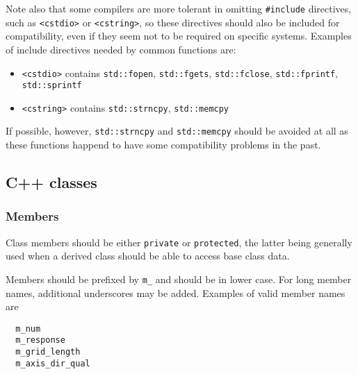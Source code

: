 \documentclass{article}[12pt,a4]
\begin{document}
Note also that some compilers are more tolerant in omitting {\tt \#include} directives, such
as {\tt <cstdio>} or {\tt <cstring>}, so these directives should also be included for compatibility,
even if they seem not to be required on specific systems.
Examples of include directives needed by common functions are:
\begin{itemize}
\item[] {\tt <cstdio>} contains {\tt std::fopen}, {\tt std::fgets}, {\tt std::fclose}, {\tt std::fprintf}, {\tt std::sprintf}
\item[] {\tt <cstring>} contains {\tt std::strncpy}, {\tt std::memcpy}
\end{itemize}

If possible, however, {\tt std::strncpy} and {\tt std::memcpy} should be avoided at all as these
functions happend to have some compatibility problems in the past.



\subsection{C++ classes}

\subsubsection{Members}

Class members should be either {\tt private} or {\tt protected}, the latter being generally used
when a derived class should be able to access base class data.

Members should be prefixed by {\tt m\_} and should be in lower case.
For long member names, additional underscores may be added.
Examples of valid member names are
\begin{verbatim}
  m_num
  m_response
  m_grid_length
  m_axis_dir_qual
\end{verbatim}
\end{document}
